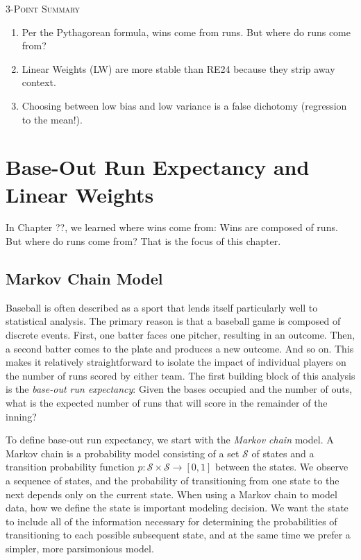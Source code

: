 \documentclass{article}
\begin{document}
\begin{framed}
  \textsc{3-Point Summary}
  \begin{enumerate}
    \item Per the Pythagorean formula, wins come from runs. But where do runs come from?
    \item Linear Weights (LW) are more stable than RE24 because they strip away context.
    \item Choosing between low bias and low variance is a false dichotomy (regression to the mean!).
  \end{enumerate}
\end{framed}

  \setcounter{section}{1}
  \section{\sc Base-Out Run Expectancy and Linear Weights}

    In Chapter ??, we learned where wins come from: Wins are composed of runs. But where do runs come from? That is the focus of this chapter.

    \subsection{\sc Markov Chain Model}

      Baseball is often described as a sport that lends itself particularly well to statistical analysis. The primary reason is that a baseball game is composed of discrete events. First, one batter faces one pitcher, resulting in an outcome. Then, a second batter comes to the plate and produces a new outcome. And so on. This makes it relatively straightforward to isolate the impact of individual players on the number of runs scored by either team. The first building block of this analysis is the {\it base-out run expectancy}: Given the bases occupied and the number of outs, what is the expected number of runs that will score in the remainder of the inning?

      To define base-out run expectancy, we start with the {\it Markov chain} model. A Markov chain is a probability model consisting of a set $\mathcal S$ of states and a transition probability function $p : \mathcal S \times \mathcal S \rightarrow [0, 1]$ between the states. We observe a sequence of states, and the probability of transitioning from one state to the next depends only on the current state. When using a Markov chain to model data, how we define the state is important modeling decision. We want the state to include all of the information necessary for determining the probabilities of transitioning to each possible subsequent state, and at the same time we prefer a simpler, more parsimonious model.
\end{document}
